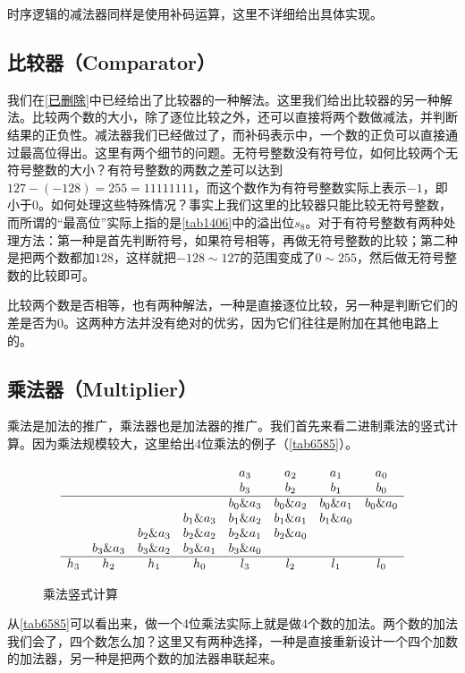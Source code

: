 时序逻辑的减法器同样是使用补码运算，这里不详细给出具体实现。

\subsection{比较器（Comparator）}
我们在\autoref{已删除}中已经给出了比较器的一种解法。这里我们给出比较器的另一种解法。比较两个数的大小，除了逐位比较之外，还可以直接将两个数做减法，并判断结果的正负性。减法器我们已经做过了，而补码表示中，一个数的正负可以直接通过最高位得出。这里有两个细节的问题。无符号整数没有符号位，如何比较两个无符号整数的大小？有符号整数的两数之差可以达到$127-(-128)=255=11111111$，而这个数作为有符号整数实际上表示$-1$，即小于0。如何处理这些特殊情况？事实上我们这里的比较器只能比较无符号整数，而所谓的“最高位”实际上指的是\autoref{tab1406}中的溢出位$s_8$。对于有符号整数有两种处理方法：第一种是首先判断符号，如果符号相等，再做无符号整数的比较；第二种是把两个数都加$128$，这样就把$-128\sim127$的范围变成了$0\sim255$，然后做无符号整数的比较即可。

比较两个数是否相等，也有两种解法，一种是直接逐位比较，另一种是判断它们的差是否为0。这两种方法并没有绝对的优劣，因为它们往往是附加在其他电路上的。

\subsection{乘法器（Multiplier）}
乘法是加法的推广，乘法器也是加法器的推广。我们首先来看二进制乘法的竖式计算。因为乘法规模较大，这里给出4位乘法的例子（\autoref{tab6585}）。

\begin{figure}[!h]
$$
\begin{array}{ccccccccc}
&&&&a_3&a_2&a_1&a_0\\
&&&&b_3&b_2&b_1&b_0\\\hline
&&&&b_0\&a_3&b_0\&a_2&b_0\&a_1&b_0\&a_0\\
&&&b_1\&a_3&b_1\&a_2&b_1\&a_1&b_1\&a_0\\
&&b_2\&a_3&b_2\&a_2&b_2\&a_1&b_2\&a_0\\
&b_3\&a_3&b_3\&a_2&b_3\&a_1&b_3\&a_0\\\hline
h_3&h_2&h_1&h_0&l_3&l_2&l_1&l_0
\end{array}
$$
\caption{乘法竖式计算}\label{tab6585}
\end{figure}

从\autoref{tab6585}可以看出来，做一个4位乘法实际上就是做4个数的加法。两个数的加法我们会了，四个数怎么加？这里又有两种选择，一种是直接重新设计一个四个加数的加法器，另一种是把两个数的加法器串联起来。

